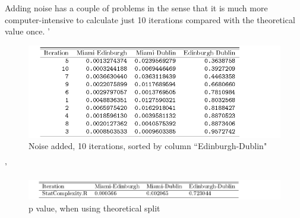 Adding noise has a couple of problems in the sense that it is much more computer-intensive to calculate just 10 iterations compared with the theoretical value once.
'\begin{figure}
    \centering
    \includegraphics[width=\textwidth,keepaspectratio]{./Weather/pValuesTheoretical,10=Iterations,Sorted.pdf}
    \caption{Noise added, 10 iterations, sorted by column “Edinburgh-Dublin"}
\end{figure}

'\begin{figure}
    \centering
    \includegraphics[width=\textwidth,keepaspectratio]{./Weather/pValuesTheoretical.pdf}
    \caption{p value, when using theoretical split}
\end{figure}

